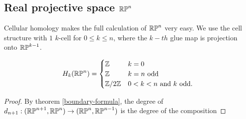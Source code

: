 \subsection{Real projective space $\mathbb{RP}^{n}$}
Cellular homology makes the full calculation of $\mathbb{RP}^{n}$ very easy. We use the cell structure with $1$ $k$-cell for $0\leq k\leq n$, where the $k-th$ glue map is projection onto $\mathbb{RP}^{k-1}$.

\begin{proposition}
$$H_k(\mathbb{RP}^{n})=\begin{cases}\mathbb{Z} & k=0 \\
\mathbb{Z} &k=n \text{ odd}\\
\mathbb{Z}/2\mathbb{Z} & 0<k<n \text{ and } k \text{ odd.} \end{cases}$$
\end{proposition}
\begin{proof}
By theorem \ref{boundary-formula}, the degree of $d_{n+1}:(\mathbb{RP}^{n+1},\mathbb{RP}^{n})\rightarrow (\mathbb{RP}^{n},\mathbb{RP}^{n-1})$ is the degree of the composition


\end{proof}

